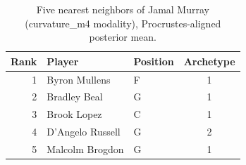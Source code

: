 \begin{table}[htbp]
  \centering\small
  \begin{tabular}{rllc}
    \toprule
    Rank & Player & Position & Archetype \\
    \midrule
    1 & Byron Mullens & F & 1 \\
    2 & Bradley Beal & G & 1 \\
    3 & Brook Lopez & C & 1 \\
    4 & D'Angelo Russell & G & 2 \\
    5 & Malcolm Brogdon & G & 1 \\
    \bottomrule
  \end{tabular}
  \caption{Five nearest neighbors of Jamal Murray (curvature_m4 modality), Procrustes-aligned posterior mean.}
  \label{tab:Jamal_Murray_neighbors_curvature_m4}
\end{table}

